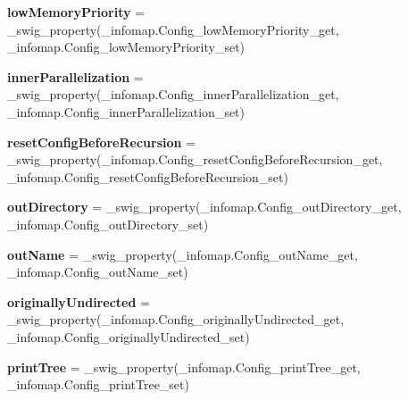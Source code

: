 \begin{DoxyCompactItemize}
{\bfseries low\+Memory\+Priority} = \+\_\+swig\+\_\+property(\+\_\+infomap.\+Config\+\_\+low\+Memory\+Priority\+\_\+get, \+\_\+infomap.\+Config\+\_\+low\+Memory\+Priority\+\_\+set)
\item 
\mbox{\label{classinfomapfolder_1_1infomap_1_1Config_a212097b08331342054b2ce5c2368e230}} 
{\bfseries inner\+Parallelization} = \+\_\+swig\+\_\+property(\+\_\+infomap.\+Config\+\_\+inner\+Parallelization\+\_\+get, \+\_\+infomap.\+Config\+\_\+inner\+Parallelization\+\_\+set)
\item 
\mbox{\label{classinfomapfolder_1_1infomap_1_1Config_a21c107e495cfaf3435c02f0a728c1a60}} 
{\bfseries reset\+Config\+Before\+Recursion} = \+\_\+swig\+\_\+property(\+\_\+infomap.\+Config\+\_\+reset\+Config\+Before\+Recursion\+\_\+get, \+\_\+infomap.\+Config\+\_\+reset\+Config\+Before\+Recursion\+\_\+set)
\item 
\mbox{\label{classinfomapfolder_1_1infomap_1_1Config_a1895d7e2af41a532b2046e0412962c74}} 
{\bfseries out\+Directory} = \+\_\+swig\+\_\+property(\+\_\+infomap.\+Config\+\_\+out\+Directory\+\_\+get, \+\_\+infomap.\+Config\+\_\+out\+Directory\+\_\+set)
\item 
\mbox{\label{classinfomapfolder_1_1infomap_1_1Config_a6bf0aca13a0ce6cee179c0e92c4fc266}} 
{\bfseries out\+Name} = \+\_\+swig\+\_\+property(\+\_\+infomap.\+Config\+\_\+out\+Name\+\_\+get, \+\_\+infomap.\+Config\+\_\+out\+Name\+\_\+set)
\item 
\mbox{\label{classinfomapfolder_1_1infomap_1_1Config_ad241b55c747d29f9c4feed35f6f151a3}} 
{\bfseries originally\+Undirected} = \+\_\+swig\+\_\+property(\+\_\+infomap.\+Config\+\_\+originally\+Undirected\+\_\+get, \+\_\+infomap.\+Config\+\_\+originally\+Undirected\+\_\+set)
\item 
\mbox{\label{classinfomapfolder_1_1infomap_1_1Config_a4f0649b054ccc80158a90e146e316277}} 
{\bfseries print\+Tree} = \+\_\+swig\+\_\+property(\+\_\+infomap.\+Config\+\_\+print\+Tree\+\_\+get, \+\_\+infomap.\+Config\+\_\+print\+Tree\+\_\+set)
\item 

\end{DoxyCompactItemize}
